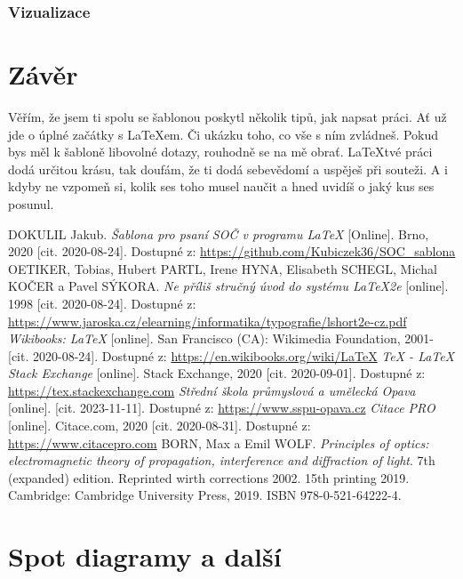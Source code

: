 \documentclass[12pt, a4paper,
twoside,        %
openright
]{report}
\begin{document}
\subsection[Vizualizace]{Vizualizace}
	\chapter*{Závěr}
	
	Věřím, že jsem ti spolu se šablonou poskytl několik tipů, jak napsat práci. Ať už jde o úplné začátky s \LaTeX{}em. Či ukázku toho, co vše s ním zvládneš. Pokud bys měl k šabloně libovolné dotazy, rouhodně se na mě obrať. \LaTeX tvé práci dodá určitou krásu, tak doufám, že ti dodá sebevědomí a uspěješ při souteži. A i kdyby ne vzpomeň si, kolik ses toho musel naučit a hned uvidíš o jaký kus ses posunul.
	
	\begin{thebibliography}{99}
		 DOKULIL Jakub. \textit{Šablona pro psaní SOČ v programu \LaTeX} [Online]. Brno, 2020 [cit. 2020-08-24]. Dostupné z: \url{https://github.com/Kubiczek36/SOC_sablona}
		OETIKER, Tobias, Hubert PARTL, Irene HYNA, Elisabeth SCHEGL, Michal KOČER a Pavel SÝKORA. \textit{Ne příliš stručný úvod do systému LaTeX2e} [online]. 1998 [cit. 2020-08-24]. Dostupné z: \url{https://www.jaroska.cz/elearning/informatika/typografie/lshort2e-cz.pdf}
		\textit{Wikibooks: LaTeX} [online]. San Francisco (CA): Wikimedia Foundation, 2001- [cit. 2020-08-24]. Dostupné z: \url{https://en.wikibooks.org/wiki/LaTeX}
		 \textit{TeX - LaTeX Stack Exchange} [online]. Stack Exchange, 2020 [cit. 2020-09-01]. Dostupné z: \url{https://tex.stackexchange.com}
		 \textit{Střední škola průmyslová a umělecká Opava} [online]. [cit. 2023-11-11]. Dostupné z: \url{https://www.sspu-opava.cz}
		\textit{Citace PRO} [online]. Citace.com, 2020 [cit. 2020-08-31]. Dostupné z: \url{https://www.citacepro.com}
		 BORN, Max a Emil WOLF. \textit{Principles of optics: electromagnetic theory of propagation, interference and diffraction of light}. 7th (expanded) edition. Reprinted wirth corrections 2002. 15th printing 2019. Cambridge: Cambridge University Press, 2019. ISBN 978-0-521-64222-4.
	\end{thebibliography}
	
	\listoffigures
	
	\listoftables
	
	\appendix %
	
	[\vspace{-22pt}] %
	
	
	\chapter{%
		Spot diagramy a další }
	
	
\end{document}
